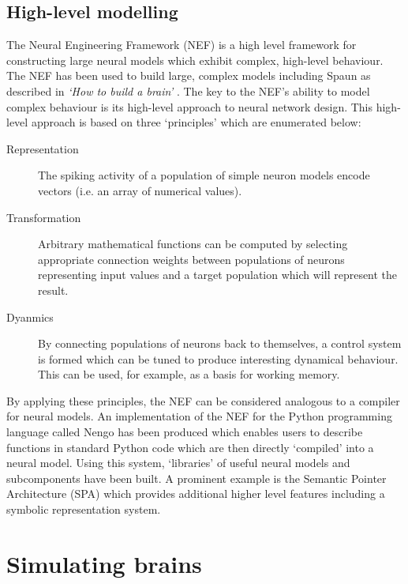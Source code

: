 		\subsection{High-level modelling}
			
			The Neural Engineering Framework (NEF) \cite{eliasmith04} is a high level
			framework for constructing large neural models which exhibit complex,
			high-level behaviour. The NEF has been used to build large, complex models
			including Spaun as described in \emph{`How to build a brain'}
			\cite{eliasmith13}. The key to the NEF's ability to model complex
			behaviour is its high-level approach to neural network design. This
			high-level approach is based on three `principles' which are enumerated
			below:
			
			\begin{description}
				
				\item[Representation] The spiking activity of a population of simple
				neuron models encode vectors (i.e. an array of numerical values).
				
				\item[Transformation] Arbitrary mathematical functions can be computed
				by selecting appropriate connection weights between populations of
				neurons representing input values and a target population which will
				represent the result.
				
				\item[Dyanmics] By connecting populations of neurons back to themselves,
				a control system is formed which can be tuned to produce interesting
				dynamical behaviour. This can be used, for example, as a basis for
				working memory.
				
			\end{description}
			
			By applying these principles, the NEF can be considered analogous to a
			compiler for neural models. An implementation of the NEF for the Python
			programming language called Nengo has been produced which enables users to
			describe functions in standard Python code which are then directly
			`compiled' into a neural model. Using this system, `libraries' of useful
			neural models and subcomponents have been built. A prominent example is
			the Semantic Pointer Architecture (SPA) \cite{eliasmith13} which provides
			additional higher level features including a symbolic representation
			system.
		
	
	\section{Simulating brains}
		
